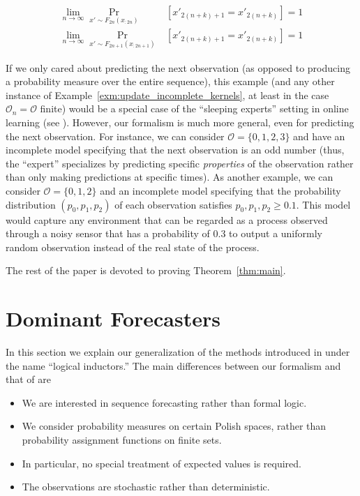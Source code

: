 \documentclass[11pt]{article}
\theoremstyle{definition}
\theoremstyle{plain}
\newcommand{\Ob}{\mathcal{O}}
\begin{document}
\begin{align}
\lim_{n\rightarrow\infty} \Pr_{x' \sim F_{2n}\left(x_{:2n}\right)}&\left[x'_{2(n+k)+1}=x'_{2(n+k)}\right] = 1\\
\lim_{n\rightarrow\infty} \Pr_{x' \sim F_{2n+1}\left(x_{:2n+1}\right)}&\left[x'_{2(n+k)+1}=x'_{2(n+k)}\right] = 1
\end{align}

If we only cared about predicting the next observation (as opposed to producing a probability measure over the entire sequence), this example (and any other instance of Example~\ref{exm:update_incomplete_kernels}, at least in the case $\Ob_n=\Ob$ finite) would be a special case of the \enquote{sleeping experts} setting in online learning (see \cite{Freund_1997}). However, our formalism is much more general, even for predicting the next observation. For instance, we can consider $\Ob=\{0,1,2,3\}$ and have an incomplete model specifying that the next observation is an odd number (thus, the \enquote{expert} specializes by predicting specific \emph{properties} of the observation rather than only making predictions at specific times). As another example, we can consider $\Ob=\{0,1,2\}$ and an incomplete model specifying that the probability distribution $\left(p_0,p_1,p_2\right)$ of each observation satisfies $p_0,p_1,p_2 \geq 0.1$. This model would capture any environment that can be regarded as a process observed through a noisy sensor that has a probability of 0.3 to output a uniformly random observation instead of the real state of the process.

The rest of the paper is devoted to proving Theorem~\ref{thm:main}.

\section{Dominant Forecasters}
\label{sec:garrabrant}

In this section we explain our generalization of the methods introduced in \cite{Garrabrant_2016} under the name \enquote{logical inductors.} The main differences between our formalism and that of \cite{Garrabrant_2016} are

\begin{itemize}
\item 
We are interested in sequence forecasting rather than formal logic.
\item
We consider probability measures on certain Polish spaces, rather than probability assignment functions on finite sets.
\item
In particular, no special treatment of expected values is required.
\item
The observations are stochastic rather than deterministic.
\end{itemize}
\end{document}
